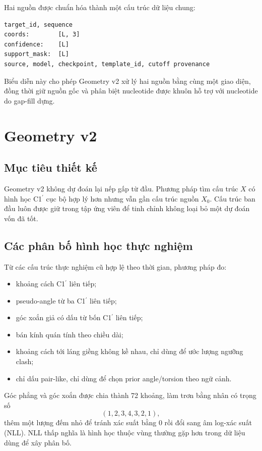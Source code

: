 \documentclass[12pt,a4paper,oneside]{report}
\newcommand{\cprime}{C1$^{\prime}$}
\begin{document}
Hai nguồn được chuẩn hóa thành một cấu trúc dữ liệu chung:

\begin{lstlisting}
target_id, sequence
coords:        [L, 3]
confidence:    [L]
support_mask:  [L]
source, model, checkpoint, template_id, cutoff provenance
\end{lstlisting}

Biểu diễn này cho phép Geometry v2 xử lý hai nguồn bằng cùng một giao diện, đồng thời
giữ nguồn gốc và phân biệt nucleotide được khuôn hỗ trợ với nucleotide do gap-fill dựng.

\section{Geometry v2}

\subsection{Mục tiêu thiết kế}

Geometry v2 không dự đoán lại nếp gấp từ đầu. Phương pháp tìm cấu trúc $X$ có hình học
\cprime{} cục bộ hợp lý hơn nhưng vẫn gần cấu trúc nguồn $X_0$. Cấu trúc ban đầu luôn
được giữ trong tập ứng viên để tinh chỉnh không loại bỏ một dự đoán vốn đã tốt.

\subsection{Các phân bố hình học thực nghiệm}

Từ các cấu trúc thực nghiệm cũ hợp lệ theo thời gian, phương pháp đo:

\begin{itemize}
  \item khoảng cách \cprime{} liên tiếp;
  \item pseudo-angle từ ba \cprime{} liên tiếp;
  \item góc xoắn giả có dấu từ bốn \cprime{} liên tiếp;
  \item bán kính quán tính theo chiều dài;
  \item khoảng cách tới láng giềng không kề nhau, chỉ dùng để ước lượng ngưỡng clash;
  \item chỉ dấu pair-like, chỉ dùng để chọn prior angle/torsion theo ngữ cảnh.
\end{itemize}

Góc phẳng và góc xoắn được chia thành 72 khoảng, làm trơn bằng nhân có trọng số
\begin{equation}
(1,2,3,4,3,2,1),
\end{equation}
thêm
một lượng đếm nhỏ để tránh xác suất bằng 0 rồi đổi sang âm log-xác suất (NLL). NLL thấp
nghĩa là hình học thuộc vùng thường gặp hơn trong dữ liệu dùng để xây phân bố.
\end{document}
